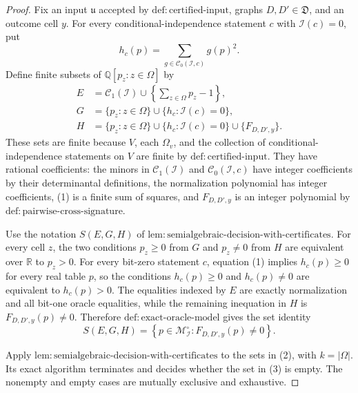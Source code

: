 \documentclass{article}
\begin{document}
\begin{proof}
Fix an input \(\mathfrak u\) accepted by \(\mathrm{def{:}certified\text{-}input}\), graphs \(D,D'\in\mathfrak D\), and an outcome cell \(y\).  For every conditional-independence statement \(c\) with \(\mathcal I(c)=0\), put
\[
 h_c(p)=\sum_{g\in\mathcal C_0(\mathcal I,c)}g(p)^2.
\tag{1}
\]
Define finite subsets of \(\mathbb Q[p_z:z\in\Omega]\) by
\[
 \begin{aligned}
 E&=\mathcal C_1(\mathcal I)\cup
 \left\{\sum_{z\in\Omega}p_z-1\right\},\\
 G&=\{p_z:z\in\Omega\}\cup
 \{h_c:\mathcal I(c)=0\},\\
 H&=\{p_z:z\in\Omega\}\cup
 \{h_c:\mathcal I(c)=0\}\cup\{F_{D,D',y}\}.
 \end{aligned}
\tag{2}
\]
These sets are finite because \(V\), each \(\Omega_v\), and the collection of conditional-independence statements on \(V\) are finite by \(\mathrm{def{:}certified\text{-}input}\).  They have rational coefficients: the minors in \(\mathcal C_1(\mathcal I)\) and \(\mathcal C_0(\mathcal I,c)\) have integer coefficients by their determinantal definitions, the normalization polynomial has integer coefficients, (1) is a finite sum of squares, and \(F_{D,D',y}\) is an integer polynomial by \(\mathrm{def{:}pairwise\text{-}cross\text{-}signature}\).

Use the notation \(S(E,G,H)\) of \(\mathrm{lem{:}semialgebraic\text{-}decision\text{-}with\text{-}certificates}\).  For every cell \(z\), the two conditions \(p_z\geq0\) from \(G\) and \(p_z\neq0\) from \(H\) are equivalent over \(\mathbb R\) to \(p_z>0\).  For every bit-zero statement \(c\), equation (1) implies \(h_c(p)\geq0\) for every real table \(p\), so the conditions \(h_c(p)\geq0\) and \(h_c(p)\neq0\) are equivalent to \(h_c(p)>0\).  The equalities indexed by \(E\) are exactly normalization and all bit-one oracle equalities, while the remaining inequation in \(H\) is \(F_{D,D',y}(p)\neq0\).  Therefore \(\mathrm{def{:}exact\text{-}oracle\text{-}model}\) gives the set identity
\[
 S(E,G,H)
 =\left\{p\in\mathcal M_{\mathcal I}^{\circ}:
 F_{D,D',y}(p)\neq0\right\}.
\tag{3}
\]

Apply \(\mathrm{lem{:}semialgebraic\text{-}decision\text{-}with\text{-}certificates}\) to the sets in (2), with \(k=|\Omega|\).  Its exact algorithm terminates and decides whether the set in (3) is empty.  The nonempty and empty cases are mutually exclusive and exhaustive.


\end{proof}
\end{document}
